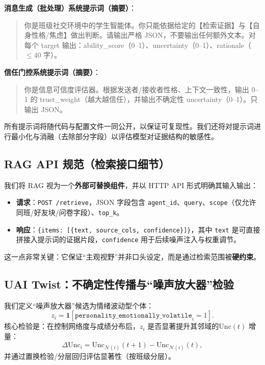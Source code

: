 \documentclass[UTF8, a4paper, 11pt]{ctexart}
\begin{document}
\textbf{消息生成（批处理）系统提示词（摘要）}：
\begin{quote}\small
你是班级社交环境中的学生智能体。你只能依据给定的【检索证据】与【自身性格/焦虑】做出判断。请输出严格 JSON，不要输出任何额外文本。对每个 target 输出：ability\_score（0--1）、uncertainty（0--1）、rationale（\(\le 40\) 字）。
\end{quote}

\textbf{信任门控系统提示词（摘要）}：
\begin{quote}\small
你是信息可信度评估器。根据发送者/接收者性格、上下文一致性，输出 0--1 的 trust\_weight（越大越信任），并输出不确定性 uncertainty（0--1）。只输出 JSON。
\end{quote}

所有提示词将随代码与配置文件一同公开，以保证可复现性。我们还将对提示词进行最小化与消融（去除部分字段）以评估模型对证据结构的敏感性。

\subsection{RAG API 规范（检索接口细节）}
我们将 RAG 视为一个\textbf{外部可替换组件}，并以 HTTP API 形式明确其输入输出：
\begin{itemize}
    \item \textbf{请求}：\texttt{POST /retrieve}，JSON 字段包含 \texttt{agent\_id}、\texttt{query}、\texttt{scope}（仅允许同班/好友块/问卷字段）、\texttt{top\_k}。
    \item \textbf{响应}：\texttt{\{items: [\{text, source\_cols, confidence\}]\}}，其中 \texttt{text} 是可直接拼接入提示词的证据片段，\texttt{confidence} 用于后续噪声注入与权重调节。
\end{itemize}
这一点非常关键：它保证“主观视野”并非口头设定，而是通过检索范围被\textbf{硬约束}。

\subsection{UAI Twist：不确定性传播与“噪声放大器”检验}
我们定义“噪声放大器”候选为情绪波动型个体：
\[
z_i = \mathbf{1}[\texttt{personality\_emotionally\_volatile}_i=1].
\]
核心检验是：在控制网络度与成绩分布后，\(z_i\) 是否显著提升其邻域的\(\text{Unc}(t)\) 增量：
\[
\Delta \text{Unc}_i = \text{Unc}_{\mathcal{N}(i)}(t+1)-\text{Unc}_{\mathcal{N}(i)}(t),
\]
并通过置换检验/分层回归评估显著性（按班级分层）。
\end{document}
